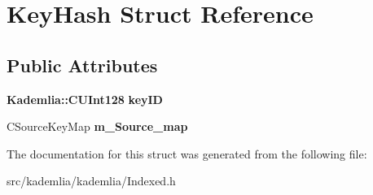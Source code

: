 \section{KeyHash Struct Reference}
\label{structKeyHash}
\subsection*{Public Attributes}
\begin{DoxyCompactItemize}
\item 
{\bf Kademlia::CUInt128} {\bfseries keyID}\label{structKeyHash_a6cf29c84bb3f2cc88b7668c65922982b}

\item 
CSourceKeyMap {\bfseries m\_\-Source\_\-map}\label{structKeyHash_a703a0198fbdfc6957957ef291890ed81}

\end{DoxyCompactItemize}


The documentation for this struct was generated from the following file:\begin{DoxyCompactItemize}
\item 
src/kademlia/kademlia/Indexed.h\end{DoxyCompactItemize}
